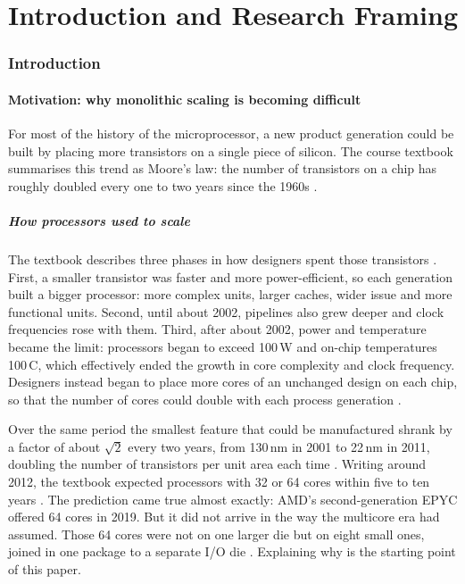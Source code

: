 \clearpage
\part{Introduction and Research Framing}
\label{part:intro}
\section{Introduction}
\label{sec:intro}

\subsection{Motivation: why monolithic scaling is becoming difficult}
\label{sec:motivation}

For most of the history of the microprocessor, a new product generation could be built by placing more transistors on a single piece of silicon. The course textbook summarises this trend as Moore's law: the number of transistors on a chip has roughly doubled every one to two years since the 1960s \cite[sec.~12.1.1]{sarangi2025basic}.

\subsubsection*{How processors used to scale}
The textbook describes three phases in how designers spent those transistors \cite[sec.~12.1.2]{sarangi2025basic}. First, a smaller transistor was faster and more power-efficient, so each generation built a bigger processor: more complex units, larger caches, wider issue and more functional units. Second, until about 2002, pipelines also grew deeper and clock frequencies rose with them. Third, after about 2002, power and temperature became the limit: processors began to exceed 100\,W and on-chip temperatures 100\,\textdegree C, which effectively ended the growth in core complexity and clock frequency. Designers instead began to place more cores of an unchanged design on each chip, so that the number of cores could double with each process generation \cite[sec.~12.1.2]{sarangi2025basic}.

Over the same period the smallest feature that could be manufactured shrank by a factor of about $\sqrt{2}$ every two years, from 130\,nm in 2001 to 22\,nm in 2011, doubling the number of transistors per unit area each time \cite[sec.~12.1.1, Table~12.1]{sarangi2025basic}. Writing around 2012, the textbook expected processors with 32 or 64 cores within five to ten years \cite[sec.~12.1.2]{sarangi2025basic}. The prediction came true almost exactly: AMD's second-generation EPYC offered 64 cores in 2019. But it did not arrive in the way the multicore era had assumed. Those 64 cores were not on one larger die but on eight small ones, joined in one package to a separate I/O die \cite{naffziger2020chiplet}. Explaining why is the starting point of this paper.

